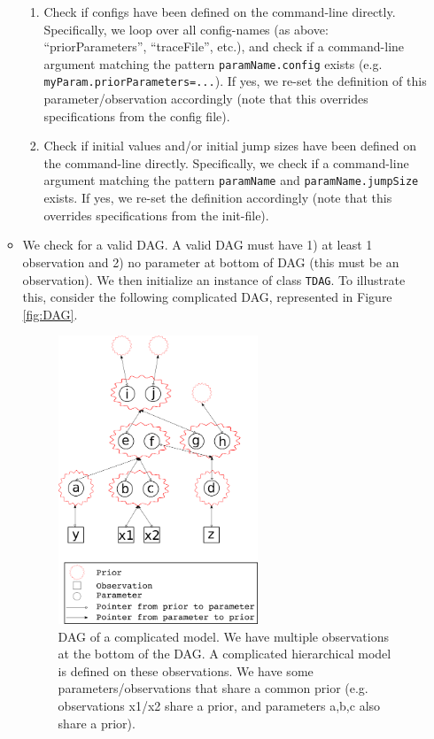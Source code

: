 \documentclass[a4paper,11pt]{article}
\newcommand{\class}[1]{\texttt{#1}}
\begin{document}
\begin{itemize}
\begin{itemize}
\begin{enumerate}
   \item Check if configs have been defined on the command-line directly. Specifically, we loop over all config-names (as above: ``priorParameters'', ``traceFile'', etc.), and check if a command-line argument matching the pattern \texttt{paramName.config} exists (e.g. \texttt{myParam.priorParameters=...}). If yes, we re-set the definition of this parameter/observation accordingly (note that this overrides specifications from the config file).
   \item Check if initial values and/or initial jump sizes have been defined on the command-line directly. Specifically, we check if a command-line argument matching the pattern \texttt{paramName} and \texttt{paramName.jumpSize} exists. If yes, we re-set the definition accordingly (note that this overrides specifications from the init-file).
  \end{enumerate}
  \item We check for a valid DAG. A valid DAG must have 1) at least 1 observation and 2) no parameter at bottom of DAG (this must be an observation). We then initialize an instance of class \class{TDAG}. To illustrate this, consider the following complicated DAG, represented in Figure \ref{fig:DAG}.
  \begin{figure}[t]
\begin{center}
\includegraphics[width=0.6\textwidth]{Figures/DAG.png}
\end{center}
\caption{DAG of a complicated model. We have multiple observations at the bottom of the DAG. A complicated hierarchical model is defined on these observations. We have some parameters/observations that share a common prior (e.g. observations x1/x2 share a prior, and parameters a,b,c also share a prior).}

\end{figure}
\end{itemize}
\end{itemize}
\end{document}
